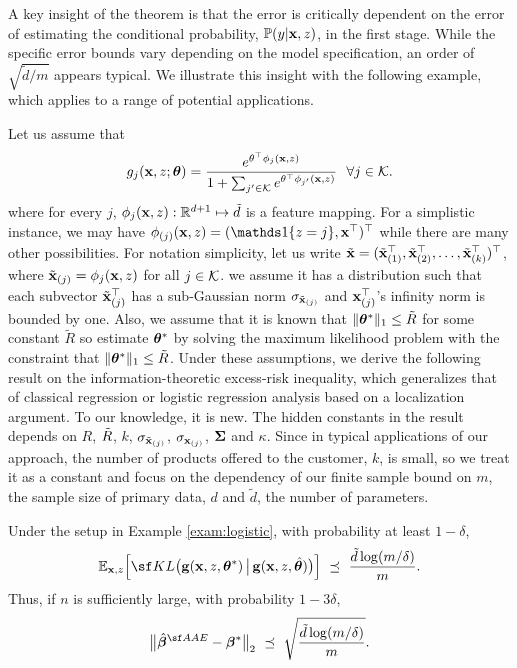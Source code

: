 {A key insight of the theorem is that the error is critically dependent on the error of estimating the conditional probability, $\mathbb{P}(y | \mathbf{x}, z)$, in the first stage. While the specific error bounds vary depending on the model specification, an order of $\sqrt{\tilde{d}/m}$ appears typical.
We illustrate this insight with the following example, which applies to a range of potential applications.

\begin{examp}
\label{exam:logistic}
{\upshape
    Let us assume that 
    $$
    g_{j}(\mathbf{x}, z; \bm{\theta}) = \frac{e^{\theta^{\top}\phi_j(\mathbf{x}, z)}}{1+\sum_{j' \in \mathcal{K}}e^{\theta^{\top}\phi_{j'}(\mathbf{x}, z)}}~~\forall j \in \mathcal{K}.
    $$
    where for every $j$, $\phi_{j}(\mathbf{x}, z) : \mathbb{R}^{d+1} \mapsto \Tilde{d}$ is a feature mapping. For a simplistic instance, we may have $\phi_{(j)}(\x, z) = (\Indicator\{z = j\}, \x^{\top})^{\top}$ while there are many other possibilities. 
    For notation simplicity, let us write $\tilde{\mathbf{x}} = (\tilde{\mathbf{x}}^{\top}_{(1)}, \tilde{\mathbf{x}}^{\top}_{(2)}, \dots, \tilde{\mathbf{x}}^{\top}_{(k)})^{\top}$, where $\tilde{\mathbf{x}}_{(j)} = \phi_{j}(\mathbf{x}, z)$ for all $j\in \mathcal{K}$. 
    we assume it has a distribution such that each subvector $\tilde{\mathbf{x}}^{\top}_{(j)}$ has a sub-Gaussian norm $\sigma_{\tilde{\mathbf{x}}_{(j)}}$ and $\mathbf{x}^{\top}_{(j)}$'s infinity norm is bounded by one.
    Also, we assume that it is known that $\lVert \bm{\theta}^* \rVert_{1} \leq \tilde{R}$ for some constant $\tilde{R}$ so estimate $\bm{\theta}^*$ by solving the 
    maximum likelihood problem    with the constraint that $\lVert \bm{\theta}^* \rVert_{1} \leq \tilde{R}$.
    Under these assumptions, we derive the following result on the information-theoretic excess-risk inequality, which generalizes that of classical regression or logistic regression analysis based on a localization argument. 
    To our knowledge, it is new.
    The hidden constants in the result depends on $R$,  $\Tilde{R}$, $k$, $\sigma_{\tilde{\mathbf{x}}_{(j)}}$, $\sigma_{{\mathbf{x}}_{(j)}}$, $\bm{\Sigma}$ and $\kappa$.
    Since in typical applications of our approach, the number of products offered to the customer, $k$, is small, so we treat it as a constant and focus on the dependency of our finite sample bound on $m$, the sample size of primary data, $d$ and $\tilde{d}$, the number of parameters. 
    }

    \begin{prop}
    \label{prop:kl}
    Under the setup in Example \ref{exam:logistic}, with probability at least $1 - \delta$, 
    $$
    \E_{\x, z}\Big[
    {\sf KL}\big( \mathbf{g}(\x, z, \thetavec^*)\,\big\vert\,\mathbf{g}(\x, z, \hat{\thetavec})\big)
    \Big] ~\preceq~ \frac{\tilde{d}\log (m/\delta) }{m}.
    $$
    Thus, if $n$ is sufficiently large, with probability $1-3\delta$, 
    $$
    \big\lVert \hat{\betavec}^{\sf AAE} - {\betavec}^* \big\rVert_2~\preceq~
    \sqrt{\frac{\tilde{d}\log (m/\delta)}{m}}.$$
    \end{prop}


\end{examp}}
